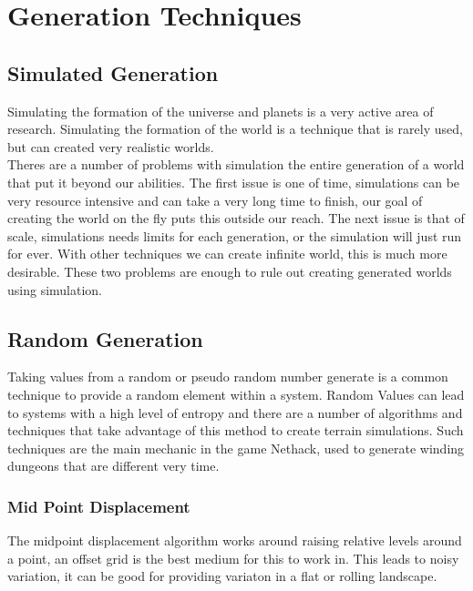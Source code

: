 \section{Generation Techniques}

\subsection{Simulated Generation}
Simulating the formation of the universe and planets is a very active area of 
research. Simulating the formation of the world is a technique that is rarely
used, but can created very realistic worlds.\\

Theres are a number of problems with
simulation the entire generation of a world that put it beyond our abilities. 
The first issue is one of time, simulations can be very resource intensive and 
can take a very long time to finish, our goal of creating the world on the fly 
puts this outside our reach. The next issue is that of scale, simulations needs
limits for each generation, or the simulation will just run for ever. With other
techniques we can create infinite world, this is much more desirable. These two
problems are enough to rule out creating generated worlds using simulation.\\

\subsection{Random Generation}
Taking values from a random or pseudo random number generate is a common 
technique to provide a random element within a system. Random Values can lead to
systems with a high level of entropy and there are a number of algorithms and 
techniques that take advantage of this method to create terrain simulations. Such
techniques are the main mechanic in the game Nethack, used to generate winding
dungeons that are different very time.\\

\subsubsection*{Mid Point Displacement}
The midpoint displacement algorithm works around raising relative levels around a
point, an offset grid is the best medium for this to work in. This leads to noisy
variation, it can be good for providing variaton in a flat or rolling landscape.\\

